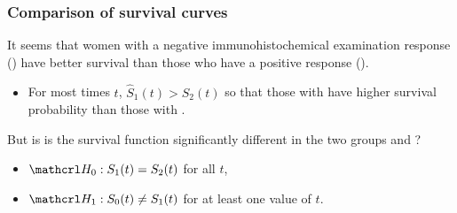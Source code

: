 \documentclass{beamer}
\begin{document}
\begin{frame}
\frametitle{Comparison of survival curves}
It seems that women with a negative immunohistochemical examination response () have \alert{better} survival than those who have a positive response ().
\begin{itemize}
\item For most times $t$, $\widehat{S}_1(t) > \widehat{S}_2(t)$ so that those with  have higher survival probability than those with .
\end{itemize}
But is is the survival function significantly different in the two groups  and ?
\begin{itemize}
\vp \vp
\item[] $\Hy_0: S_1(t) = S_2(t)$ for all $t$,
\item[] $\Hy_1: S_0(t) \neq S_1(t)$ for at least one value of $t$.
\end{itemize}
\end{frame}
\end{document}
